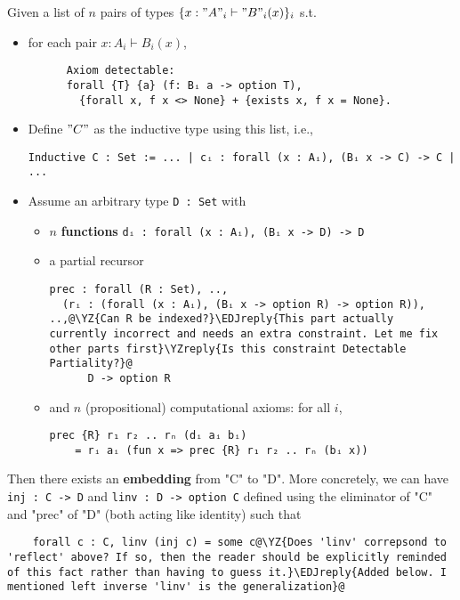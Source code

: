 \begin{theorem}\label{thm:prec-complete} Given a list of $n$ pairs of types $\{ x : "A"_i \vdash "B"_i(x) \}_{i}$ s.t.


  \begin{itemize}
    \item {} for each pair $x : A_i \vdash B_i(x)$,
    \begin{verbatim}
      Axiom detectable:
      forall {T} {a} (f: Bᵢ a -> option T),
        {forall x, f x <> None} + {exists x, f x = None}.
    \end{verbatim} 
    \item Define $"C"$ as the inductive type using this list, i.e.,
    \begin{verbatim}
Inductive C : Set := ... | cᵢ : forall (x : Aᵢ), (Bᵢ x -> C) -> C | ...
    \end{verbatim}
    \item Assume an arbitrary type \texttt{D : Set} with
    \begin{itemize}
      \item $n$ \textbf{functions} \texttt{dᵢ : forall (x : Aᵢ), (Bᵢ x -> D) -> D}  
      \item a partial recursor
      \begin{verbatim}
prec : forall (R : Set), ..,
  (rᵢ : (forall (x : Aᵢ), (Bᵢ x -> option R) -> option R)), ..,@\YZ{Can R be indexed?}\EDJreply{This part actually currently incorrect and needs an extra constraint. Let me fix other parts first}\YZreply{Is this constraint Detectable Partiality?}@
      D -> option R
      \end{verbatim}
      \item and $n$ (propositional) computational axioms: for all $i$, 
      \begin{verbatim}
prec {R} r₁ r₂ .. rₙ (dᵢ aᵢ bᵢ) 
    = rᵢ aᵢ (fun x => prec {R} r₁ r₂ .. rₙ (bᵢ x))
      \end{verbatim}
    \end{itemize}
  \end{itemize}
  Then there exists an \textbf{embedding} from "C" to "D".
  More concretely, we can have \texttt{inj : C -> D} and 
  \texttt{linv : D -> option C} defined using the eliminator of\/
  "C" and "prec" of\/ "D" (both acting like identity) such that
  \begin{verbatim}
    forall c : C, linv (inj c) = some c@\YZ{Does 'linv' correpsond to 'reflect' above? If so, then the reader should be explicitly reminded of this fact rather than having to guess it.}\EDJreply{Added below. I mentioned left inverse 'linv' is the generalization}@
  \end{verbatim}
\end{theorem}
